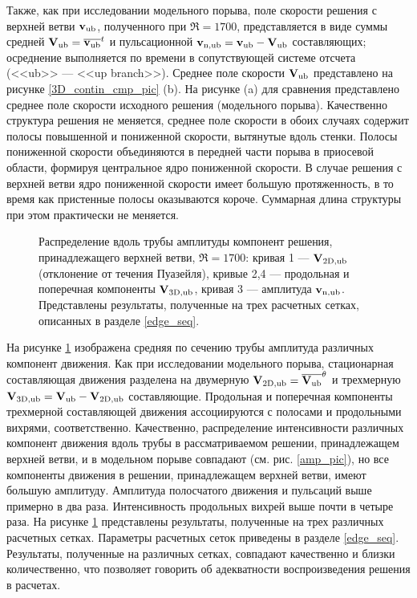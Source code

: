 Также, как при исследовании модельного порыва, поле скорости решения с верхней ветви $\mathbf{v}_\mathrm{ub}$, полученного при $\Re = 1700$, представляется в виде суммы средней $\mathbf{V}_\mathrm{ub} = \overline{\mathbf{v}_\mathrm{ub}}^t$ и пульсационной $\mathbf{v}_\mathrm{n,ub} = \mathbf{v}_\mathrm{ub} - \mathbf{V}_\mathrm{ub}$ составляющих; осреднение выполняется по времени в сопутствующей системе отсчета (<<ub>> --- <<up branch>>). Среднее поле скорости $\mathbf{V}_\mathrm{ub}$ представлено на рисунке \ref{3D_contin_cmp_pic} (b). На рисунке (a) для сравнения представлено среднее поле скорости исходного решения (модельного порыва). Качественно структура решения не меняется, среднее поле скорости в обоих случаях содержит полосы повышенной и пониженной скорости, вытянутые вдоль стенки. Полосы пониженной скорости объединяются в передней части порыва в приосевой области, формируя центральное ядро пониженной скорости. В случае решения с верхней ветви ядро пониженной скорости имеет большую протяженность, в то время как пристенные полосы оказываются короче. Суммарная длина структуры при этом практически не меняется. 


\begin{figure}
\caption{Распределение вдоль трубы амплитуды компонент решения, принадлежащего верхней ветви, $\Re = 1700$: кривая 1 --- $\mathbf{V}_\mathrm{2D,ub}$ (отклонение от течения Пуазейля), кривые 2,4 --- продольная и поперечная компоненты $\mathbf{V}_\mathrm{3D,ub}$, кривая 3 --- амплитуда $\mathbf{v}_\mathrm{n,ub}$. Представлены результаты, полученные на трех расчетных сетках, описанных в разделе \ref{edge_seq}.}
\label{amp_ub_pic}
\end{figure}


На рисунке \ref{amp_ub_pic} изображена средняя по сечению трубы амплитуда различных компонент движения. Как при исследовании модельного порыва, стационарная составляющая движения разделена на двумерную $\mathbf{V}_\mathrm{2D,ub} = \overline{\mathbf{V}_\mathrm{ub}}^{\theta}$ и трехмерную $\mathbf{V}_\mathrm{3D,ub} = \mathbf{V}_\mathrm{ub} - \mathbf{V}_\mathrm{2D,ub}$ составляющие. Продольная и поперечная компоненты трехмерной составляющей движения ассоциируются с полосами и продольными вихрями, соответственно. Качественно, распределение интенсивности различных компонент движения вдоль трубы в рассматриваемом решении, принадлежащем верхней ветви, и в модельном порыве совпадают (см. рис. \ref{amp_pic}), но все компоненты движения в решении, принадлежащем верхней ветви, имеют большую амплитуду. Амплитуда полосчатого движения и пульсаций выше примерно в два раза. Интенсивность продольных вихрей выше почти в четыре раза. На рисунке \ref{amp_ub_pic} представлены результаты, полученные на трех различных расчетных сетках. Параметры расчетных сеток приведены в разделе \ref{edge_seq}. Результаты, полученные на различных сетках, совпадают качественно и близки количественно, что позволяет говорить об адекватности воспроизведения решения в расчетах. 


